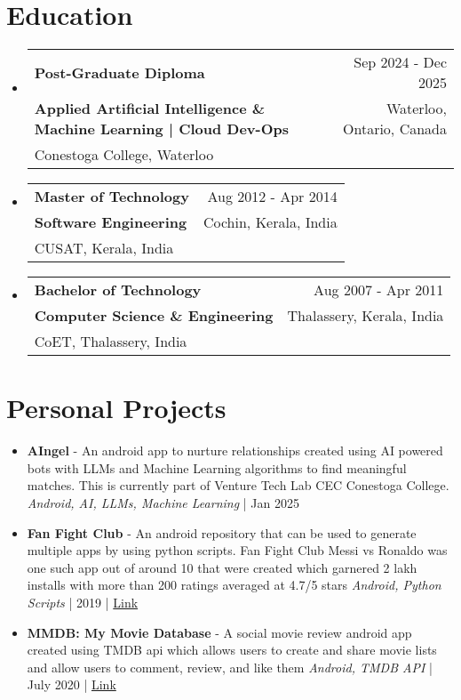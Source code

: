 \documentclass[11pt,a4paper]{article}
\makeatletter
\newcommand{\resumeThreeLineSubheading}[6]{
  \vspace{-1pt}\item
    \begin{tabular*}{0.97\textwidth}[t]{l@{\extracolsep{\fill}}r}
      \textbf{#1} & \normalfont #2 \\  %
      \textbf{\normalfont #3} & \normalfont #4 \\  %
      \normalfont #5 & \normalfont #6 \\  %
    \end{tabular*}\vspace{-5pt}
}
\makeatother
\begin{document}
\section{Education}
\begin{itemize}[leftmargin=0.15in, label={}]
\resumeThreeLineSubheading
  {Post-Graduate Diploma}
  {Sep 2024 - Dec 2025}
  {Applied Artificial Intelligence \& Machine Learning | Cloud Dev-Ops}
  {Waterloo, Ontario, Canada}
  {Conestoga College, Waterloo}
  {}

\resumeThreeLineSubheading
  {Master of Technology}
  {Aug 2012 - Apr 2014}
  {Software Engineering}
  {Cochin, Kerala, India}
  {CUSAT, Kerala, India}
  {}

\resumeThreeLineSubheading
  {Bachelor of Technology}
  {Aug 2007 - Apr 2011}
  {Computer Science \& Engineering}
  {Thalassery, Kerala, India}
  {CoET, Thalassery, India}
  {}


\end{itemize}

\section{Personal Projects}
\begin{itemize}[leftmargin=0.15in, label={}]
    \item \textbf{AIngel} - An android app to nurture relationships created using AI powered bots with LLMs and Machine Learning algorithms to find meaningful matches. This is currently part of Venture Tech Lab CEC Conestoga College.
          \textit{Android, AI, LLMs, Machine Learning} | Jan 2025

    \item \textbf{Fan Fight Club} - An android repository that can be used to generate multiple apps by using python scripts. Fan Fight Club Messi vs Ronaldo was one such app out of around 10 that were created which garnered 2 lakh installs with more than 200 ratings averaged at 4.7/5 stars
          \textit{Android, Python Scripts} | 2019 | \href{https://bitbucket.org/nikhilshankarcs/fanfightclub}{Link}

    \item \textbf{MMDB: My Movie Database} - A social movie review android app created using TMDB api which allows users to create and share movie lists and allow users to comment, review, and like them
          \textit{Android, TMDB API} | July 2020 | \href{https://bitbucket.org/nikhilshankarcs/mmdb}{Link}


\end{itemize}
\end{document}
